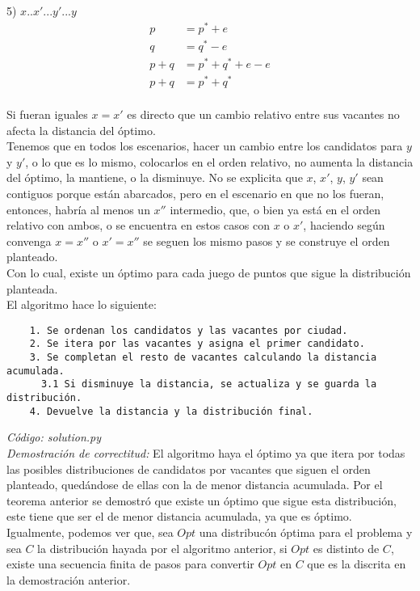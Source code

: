 \documentclass{article}
\begin{document}
5) $x..x'...y'...y$\\
    \begin{align}
        p &= p^*+e\\
        q &= q^*-e\\
        p+q &= p^*+q^*+e-e\\
        p+q &= p^*+q^*\\
    \end{align}

Si fueran iguales $x=x'$ es directo que un cambio relativo entre sus vacantes no afecta la distancia del \'optimo. \\

Tenemos que en todos los escenarios, hacer un cambio entre los candidatos para $y$ y $y'$, o lo que es lo mismo, colocarlos en el orden relativo, no aumenta la distancia del \'optimo, la mantiene, o la disminuye. No se explicita que $x$, $x'$, $y$, $y'$ sean contiguos porque est\'an abarcados, pero en el escenario en que no los fueran, entonces, habr\'ia al menos un $x''$ intermedio, que, o bien ya est\'a en el orden relativo con ambos, o se encuentra en estos casos con $x$ o $x'$, haciendo seg\'un convenga $x=x''$ o $x'=x''$ se seguen los mismo pasos y se construye el orden planteado.\\
Con lo cual, existe un \'optimo para cada juego de puntos que sigue la distribuci\'on planteada.\\

El algoritmo hace lo siguiente:\\

\begin{verbatim}
    1. Se ordenan los candidatos y las vacantes por ciudad.
    2. Se itera por las vacantes y asigna el primer candidato.
    3. Se completan el resto de vacantes calculando la distancia acumulada.
      3.1 Si disminuye la distancia, se actualiza y se guarda la distribución.
    4. Devuelve la distancia y la distribución final.
\end{verbatim}
\textit{C\'odigo: solution.py}\\

\textit{Demostraci\'on de correctitud:} El algoritmo haya el \'optimo ya que itera por todas las posibles distribuciones de candidatos por vacantes que siguen el orden planteado, qued\'andose de ellas con la de menor distancia acumulada. Por el teorema anterior se demostr\'o que existe un \'optimo que sigue esta distribuci\'on, este tiene que ser el de menor distancia acumulada, ya que es \'optimo.\\
Igualmente, podemos ver que, sea $Opt$ una distribuc\'on \'optima para el problema y sea $C$ la distribuci\'on hayada por el algoritmo anterior, si $Opt$ es distinto de $C$, existe una secuencia finita de pasos para convertir $Opt$ en $C$ que es la discrita en la demostraci\'on anterior.\\
\end{document}
